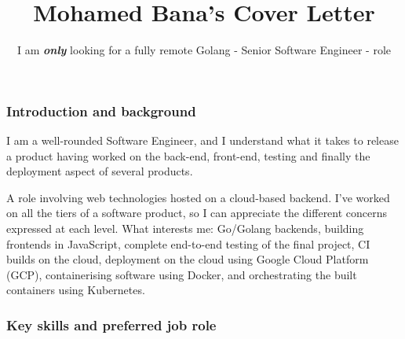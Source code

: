 \documentclass[
  a4paper,
]{article}
\title{Mohamed Bana's Cover Letter}
\author{I am \textbf{\emph{only}} looking for a fully remote Golang -
Senior Software Engineer - role}
\date{}
\begin{document}
\maketitle



\hypersetup{colorlinks,breaklinks,urlcolor=linkcolour,linkcolor=linkcolour} %


\renewcommand\UrlFont{\bfseries}

\hypertarget{introduction-and-background}{%
\subsubsection{Introduction and
background}\label{introduction-and-background}}

I am a well-rounded Software Engineer, and I understand what it takes to
release a product having worked on the back-end, front-end, testing and
finally the deployment aspect of several products.

A role involving web technologies hosted on a cloud-based backend. I've
worked on all the tiers of a software product, so I can appreciate the
different concerns expressed at each level. What interests me: Go/Golang
backends, building frontends in JavaScript, complete end-to-end testing
of the final project, CI builds on the cloud, deployment on the cloud
using Google Cloud Platform (GCP), containerising software using Docker,
and orchestrating the built containers using Kubernetes.

\hypertarget{key-skills-and-preferred-job-role}{%
\subsubsection{Key skills and preferred job
role}\label{key-skills-and-preferred-job-role}}
\end{document}
